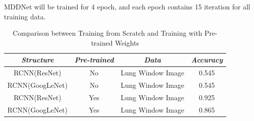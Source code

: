 MDDNet will be trained for 4 epoch, and each epoch contains 15 iteration for all training data.

\begin{table}[htb]
    \vspace{-0cm}
    \caption{Comparison between Training from Scratch and Training with Pre-trained Weights}
    \vspace{-0cm}
    \begin{center}
        \begin{tabular}{|c|c|c|c|}
        \hline
        \textbf{\textit{Structure}} & \textbf{\textit{Pre-trained}} & \textbf{\textit{Data}}& \textbf{\textit{Accuracy}}  \\
        \hline
        RCNN(ResNet) &No & Lung Window Image & 0.545\\
        RCNN(GoogLeNet) & No & Lung Window Image & 0.545\\
        RCNN(ResNet) & Yes & Lung Window Image & 0.925\\
        RCNN(GoogLeNet) & Yes & Lung Window Image & 0.865\\
        
        \hline
        \end{tabular}
    \vspace{-0cm}
    \label{pretrain}
    \end{center}
    \vspace{-0cm}
    \end{table}
